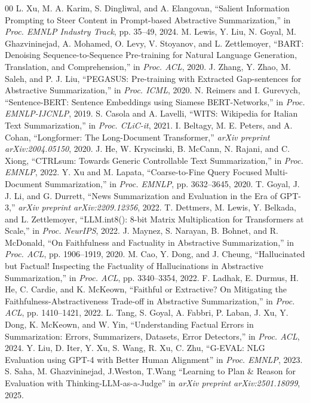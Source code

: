 \documentclass[conference]{IEEEtran}
\begin{document}
\begin{thebibliography}{00}
 L. Xu, M. A. Karim, S. Dingliwal, and A. Elangovan, ``Salient Information Prompting to Steer Content in Prompt-based Abstractive Summarization,'' in \textit{Proc. EMNLP Industry Track}, pp. 35--49, 2024.
 M. Lewis, Y. Liu, N. Goyal, M. Ghazvininejad, A. Mohamed, O. Levy, V. Stoyanov, and L. Zettlemoyer, ``BART: Denoising Sequence-to-Sequence Pre-training for Natural Language Generation, Translation, and Comprehension,'' in \textit{Proc. ACL}, 2020.
 J. Zhang, Y. Zhao, M. Saleh, and P. J. Liu, ``PEGASUS: Pre-training with Extracted Gap-sentences for Abstractive Summarization,'' in \textit{Proc. ICML}, 2020.
 N. Reimers and I. Gurevych, ``Sentence-BERT: Sentence Embeddings using Siamese BERT-Networks,'' in \textit{Proc. EMNLP-IJCNLP}, 2019.
 S. Casola and A. Lavelli, ``WITS: Wikipedia for Italian Text Summarization,'' in \textit{Proc. CLiC-it}, 2021.
 I. Beltagy, M. E. Peters, and A. Cohan, ``Longformer: The Long-Document Transformer,'' \textit{arXiv preprint arXiv:2004.05150}, 2020.
 J. He, W. Kryscinski, B. McCann, N. Rajani, and C. Xiong, ``CTRLsum: Towards Generic Controllable Text Summarization,'' in \textit{Proc. EMNLP}, 2022.
 Y. Xu and M. Lapata, ``Coarse-to-Fine Query Focused Multi-Document Summarization,'' in \textit{Proc. EMNLP}, pp. 3632--3645, 2020.
 T. Goyal, J. J. Li, and G. Durrett, ``News Summarization and Evaluation in the Era of GPT-3,'' \textit{arXiv preprint arXiv:2209.12356}, 2022.
 T. Dettmers, M. Lewis, Y. Belkada, and L. Zettlemoyer, ``LLM.int8(): 8-bit Matrix Multiplication for Transformers at Scale,'' in \textit{Proc. NeurIPS}, 2022.
 J. Maynez, S. Narayan, B. Bohnet, and R. McDonald, ``On Faithfulness and Factuality in Abstractive Summarization,'' in \textit{Proc. ACL}, pp. 1906--1919, 2020.
 M. Cao, Y. Dong, and J. Cheung, ``Hallucinated but Factual! Inspecting the Factuality of Hallucinations in Abstractive Summarization,'' in \textit{Proc. ACL}, pp. 3340--3354, 2022.
 F. Ladhak, E. Durmus, H. He, C. Cardie, and K. McKeown, ``Faithful or Extractive? On Mitigating the Faithfulness-Abstractiveness Trade-off in Abstractive Summarization,'' in \textit{Proc. ACL}, pp. 1410--1421, 2022.
 L. Tang, S. Goyal, A. Fabbri, P. Laban, J. Xu, Y. Dong, K. McKeown, and W. Yin, ``Understanding Factual Errors in Summarization: Errors, Summarizers, Datasets, Error Detectors,'' in \textit{Proc. ACL}, 2024.
 Y. Liu, D. Iter, Y. Xu, S. Wang, R. Xu, C. Zhu, ``G-EVAL: NLG Evaluation using GPT-4 with Better Human Alignment'' in \textit{Proc. EMNLP}, 2023.
 S. Saha, M. Ghazvininejad, J.Weston, T.Wang ``Learning to Plan & Reason for Evaluation with
Thinking-LLM-as-a-Judge'' in \textit{arXiv preprint arXiv:2501.18099}, 2025.
\end{thebibliography}
\end{document}
